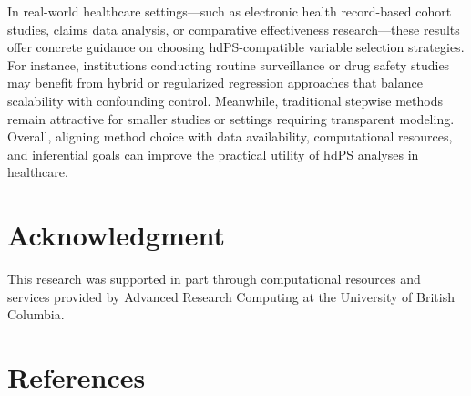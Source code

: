 \documentclass[10pt,letterpaper]{article}
\begin{document}
In real-world healthcare settings—such as electronic health record-based cohort studies, claims data analysis, or comparative effectiveness research—these results offer concrete guidance on choosing hdPS-compatible variable selection strategies. For instance, institutions conducting routine surveillance or drug safety studies may benefit from hybrid or regularized regression approaches that balance scalability with confounding control. Meanwhile, traditional stepwise methods remain attractive for smaller studies or settings requiring transparent modeling. Overall, aligning method choice with data availability, computational resources, and inferential goals can improve the practical utility of hdPS analyses in healthcare.

\section*{Acknowledgment}\label{acknowledgment}

This research was supported in part through computational resources and services provided by Advanced Research Computing at the University of British Columbia.

\section*{References}\label{references}
\end{document}

